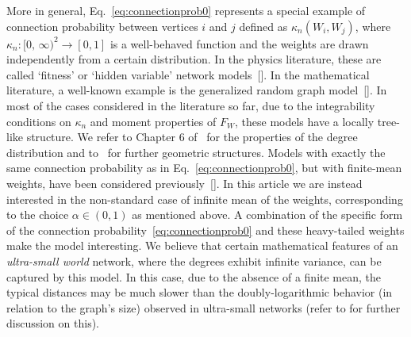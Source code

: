 \documentclass[11pt, reqno]{amsart}
\numberwithin{equation}{section}
\theoremstyle{plain} %
\theoremstyle{definition} %
\begin{document}
More in general, Eq.~\eqref{eq:connectionprob0} represents a special example of connection probability between vertices $i$ and $j$ defined as $\kappa_n(W_i,W_j)$, where $\kappa_n: [0,\, 
\infty)^2\to [0,1]$ is a well-behaved function and the weights are drawn independently from a certain distribution.
In the physics literature, these are called `fitness' or `hidden variable' network models~[\cite{caldarelli2002scale,boguna2003class,garlaschelli2007self}]. In the mathematical literature, a well-known example is the generalized random graph model~[\cite{chung2002average,van2013critical}].
In most of the cases considered in the literature so far, due to the integrability conditions on $\kappa_n$ and moment properties of $F_W$, these models have a locally tree-like structure. We refer to Chapter 6 of~\cite{van2016random} for the properties of the degree distribution and to~\cite{bollobas2007phase, van2022} for further geometric structures. 
Models with exactly the same connection probability as in Eq.~\eqref{eq:connectionprob0}, but with finite-mean weights, have been considered previously~[\cite{Rodgers_2005,norros2006conditionally,van2013critical, bhamidiscaling, bhamidi2018multiplicative}].
In this article we are instead interested in the non-standard case of infinite mean of the weights, corresponding to the choice $\alpha\in (0,1)$ as mentioned above. A combination of the specific form of the connection probability~\eqref{eq:connectionprob0} and these heavy-tailed weights make the model  interesting. We believe that certain mathematical features of an \emph{ultra-small world} network, where the degrees exhibit infinite variance, can be captured by this model. In this case, due to the absence of a finite mean, the typical distances may be much slower than the doubly-logarithmic behavior (in relation to the graph's size) observed in ultra-small networks (refer to \cite{van2017scale} for further discussion on this).
\end{document}
